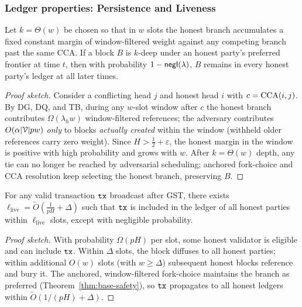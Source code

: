 \subsubsection{Ledger properties: Persistence and Liveness}
\begin{theorem}
\label{thm:base-safety}
Let $k=\Theta(w)$ be chosen so that in $w$ slots the honest branch accumulates a fixed constant margin of window-filtered weight against any competing branch past the same CCA. If a block $B$ is $k$-deep under an honest party's preferred frontier at time $t$, then with probability $1-\mathsf{negl}(\lambda)$, $B$ remains in every honest party's ledger at all later times.
\end{theorem}
\begin{proof}[Proof sketch]
Consider a conflicting head $j$ and honest head $i$ with $c=\mathrm{CCA}(i,j)$. By DG, DQ, and TB, during any $w$-slot window after $c$ the honest branch contributes $\Omega(\lambda_h w)$ window-filtered references; the adversary contributes $O(\alpha |\mathcal{V}| p w)$ \emph{only} to blocks \emph{actually created} within the window (withheld older references carry zero weight). Since $H>\tfrac{1}{2}{+}\varepsilon$, the honest margin in the window is positive with high probability and grows with $w$. After $k=\Theta(w)$ depth, any tie can no longer be reached by adversarial scheduling; anchored fork-choice and CCA resolution keep selecting the honest branch, preserving $B$.
\end{proof}

\begin{theorem}
\label{thm:base-liveness}
For any valid transaction $\mathtt{tx}$ broadcast after GST, there exists $\ell_{\mathrm{live}}=\tilde{O}\!\left( \frac{1}{pH} + \Delta \right)$ such that $\mathtt{tx}$ is included in the ledger of all honest parties within $\ell_{\mathrm{live}}$ slots, except with negligible probability.
\end{theorem}
\begin{proof}[Proof sketch]
With probability $\Omega(pH)$ per slot, some honest validator is eligible and can include $\mathtt{tx}$. Within $\Delta$ slots, the block diffuses to all honest parties; within additional $O(w)$ slots (with $w\ge \Delta$) subsequent honest blocks reference and bury it. The anchored, window-filtered fork-choice maintains the branch as preferred (Theorem~\ref{thm:base-safety}), so $\mathtt{tx}$ propagates to all honest ledgers within $\tilde{O}(1/(pH)+\Delta)$.
\end{proof}

